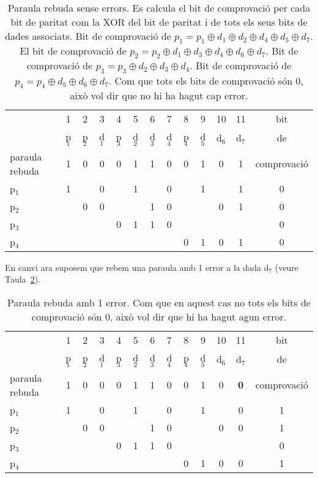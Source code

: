 \begin{table}[!htb]
\footnotesize
\centering
\begin{tabular}{|l|c|c|c|c|c|c|c|c|c|c|c|c|}\cline{2-13}
\multicolumn{1}{c|}{}&1&2&3&4&5&6&7&8&9&10&11&bit \\ \cline{2-12}
\multicolumn{1}{c|}{}&p$_1$&p$_2$&d$_1$&p$_3$&d$_2$&d$_3$&d$_4$&p$_4$&d$_5$&d$_6$&d$_7$&de\\ \cline{1-12}
paraula rebuda&1&0&0&0&1&1&0&0&1&0&1&comprovació\\ \hline
p$_1$&1&&0&&1&&0&&1&&1&0\\  \hline
p$_2$&&0&0&&&1&0&&&0&1&0\\  \hline
p$_3$&&&&0&1&1&0&&&&&0\\  \hline
p$_4$&&&&&&&&0&1&0&1&0 \\  \hline
\end{tabular}
\caption{Paraula rebuda sense errors. Es calcula el bit de comprovació per cada bit de paritat com la XOR del bit de paritat  i de tots els seus bits de dades associats. Bit de comprovació  de $p_1= p_1 \oplus d_1 \oplus d_2 \oplus d_4 \oplus d_5 \oplus d_7$. El bit de comprovació de $p_2 = p_2 \oplus d_1 \oplus d_3 \oplus d_4 \oplus d_6 \oplus d_7$. Bit de comprovació de $p_3= p_3 \oplus d_2 \oplus d_3 \oplus d_4$. Bit de comprovació de $p_4 = p_4 \oplus d_5 \oplus d_6 \oplus d_7$. Com que tots els bits de comprovació són 0, això vol dir que no hi ha hagut cap error.}
\label{Hamming74Noerror}
\end{table}


\begin{mdframed}[linewidth=2pt,linecolor=teal]
En canvi ara suposem que rebem una paraula amb 1 error a la dada d$_7$ (veure Taula~\ref{Hamming74error}).
\end{mdframed}

\begin{table}[!htb]
\footnotesize
\centering
\begin{tabular}{|l|c|c|c|c|c|c|c|c|c|c|c|c|}\cline{2-13}
\multicolumn{1}{c|}{}&1&2&3&4&5&6&7&8&9&10&11&bit \\ \cline{2-12}
\multicolumn{1}{c|}{}&p$_1$&p$_2$&d$_1$&p$_3$&d$_2$&d$_3$&d$_4$&p$_4$&d$_5$&d$_6$&d$_7$&de\\ \cline{1-12}
paraula rebuda&1&0&0&0&1&1&0&0&1&0&\textbf{\color{blue}0}&comprovació\\ \hline
p$_1$&1&&0&&1&&0&&1&&0&1\\  \hline
p$_2$&&0&0&&&1&0&&&0&0&1\\  \hline
p$_3$&&&&0&1&1&0&&&&&0\\  \hline
p$_4$&&&&&&&&0&1&0&0&1 \\  \hline
\end{tabular}
\caption{Paraula rebuda amb 1 error. Com que en aquest cas no tots els bits de comprovació  són  0, això vol dir que hi ha hagut agun error.}
\label{Hamming74error}
\end{table}

